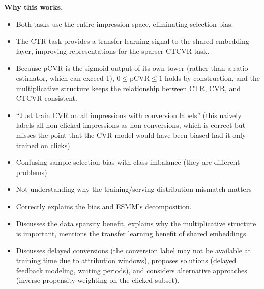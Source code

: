 \begin{interviewq}
\textbf{Why this works.}
\begin{itemize}
    \item Both tasks use the entire impression space, eliminating selection bias.
    \item The CTR task provides a transfer learning signal to the shared embedding layer, improving representations for the sparser CTCVR task.
    \item Because pCVR is the sigmoid output of its own tower (rather than a ratio estimator, which can exceed 1), $0 \leq \text{pCVR} \leq 1$ holds by construction, and the multiplicative structure keeps the relationship between CTR, CVR, and CTCVR consistent.
\end{itemize}

\redflags
\begin{itemize}
    \item ``Just train CVR on all impressions with conversion labels'' (this naively labels all non-clicked impressions as non-conversions, which is correct but misses the point that the CVR model would have been biased had it only trained on clicks)
    \item Confusing sample selection bias with class imbalance (they are different problems)
    \item Not understanding why the training/serving distribution mismatch matters
\end{itemize}


\goodgreat
\begin{itemize}
    \item {} Correctly explains the bias and ESMM's decomposition.
    \item {} Discusses the data sparsity benefit, explains why the multiplicative structure is important, mentions the transfer learning benefit of shared embeddings.
    \item {} Discusses delayed conversions (the conversion label may not be available at training time due to attribution windows), proposes solutions (delayed feedback modeling, waiting periods), and considers alternative approaches (inverse propensity weighting on the clicked subset).
\end{itemize}

\end{interviewq}

